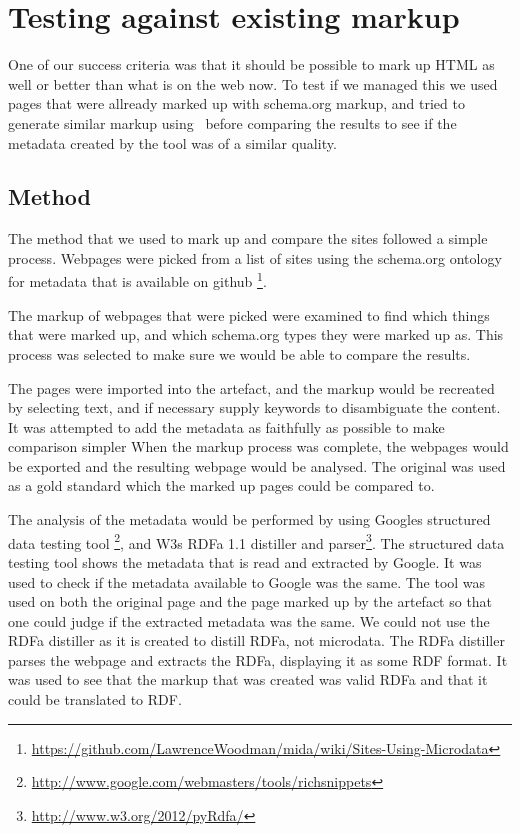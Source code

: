 
\section{Testing against existing markup}
One of our success criteria was that it should be possible to mark up HTML as well or better than what is on the web now.
To test if we managed this we used pages that were allready marked up with schema.org markup,
and tried to generate similar markup using \theartefact\ before comparing the results to see if the metadata created
by the tool was of a similar quality.

\subsection{Method}
The method that we used to mark up and compare the sites followed a simple process.
Webpages were picked from a list of sites using the schema.org ontology for metadata that is available on github
\footnote{\url{https://github.com/LawrenceWoodman/mida/wiki/Sites-Using-Microdata}}.

The markup of webpages that were picked were examined to find which things that were marked up,
and which schema.org types they were marked up as.
This process was selected to make sure we would be able to compare the results.

The pages were imported into the artefact, and the markup would be recreated by selecting text,
and if necessary supply keywords to disambiguate the content.
It was attempted to add the metadata as faithfully as possible to make comparison simpler
When the markup process was complete, the webpages would be exported and the resulting webpage would be analysed.
The original was used as a gold standard which the marked up pages could be compared to.

The analysis of the metadata would be performed by using Googles structured data testing tool
\footnote{\url{http://www.google.com/webmasters/tools/richsnippets}},
and W3s RDFa 1.1 distiller and parser\footnote{\url{http://www.w3.org/2012/pyRdfa/}}.
The structured data testing tool shows the metadata that is read and extracted by Google.
It was used to check if the metadata available to Google was the same.
The tool was used on both the original page and the page marked up by the artefact so that one could judge if the
extracted metadata was the same.
We could not use the RDFa distiller as it is created to distill RDFa, not microdata.
The RDFa distiller parses the webpage and extracts the RDFa, displaying it as some RDF format.
It was used to see that the markup that was created was valid RDFa and that it could be translated to RDF.

